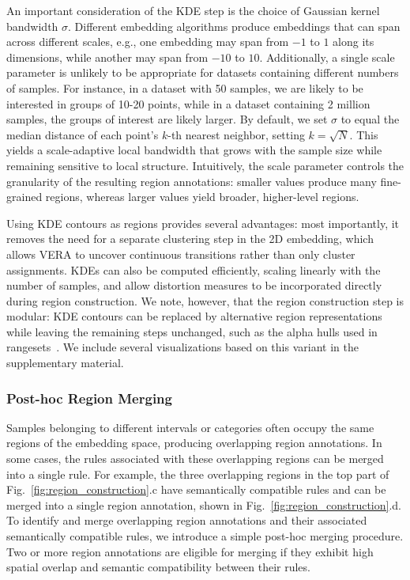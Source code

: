\documentclass[lettersize,journal]{IEEEtran}
\begin{document}
An important consideration of the KDE step is the choice of Gaussian kernel bandwidth $\sigma$.
Different embedding algorithms produce embeddings that can span across different scales, e.g., one embedding may span from $-1$ to $1$ along its dimensions, while another may span from $-10$ to $10$.
Additionally, a single scale parameter is unlikely to be appropriate for datasets containing different numbers of samples. For instance, in a dataset with 50 samples, we are likely to be interested in groups of 10-20 points, while in a dataset containing 2 million samples, the groups of interest are likely larger.
By default, we set $\sigma$ to equal the median distance of each point's $k$-th nearest neighbor, setting $k=\sqrt{N}$. This yields a scale-adaptive local bandwidth that grows with the sample size while remaining sensitive to local structure.
Intuitively, the scale parameter controls the granularity of the resulting region annotations: smaller values produce many fine-grained regions, whereas larger values yield broader, higher-level regions.

Using KDE contours as regions provides several advantages: most importantly, it removes the need for a separate clustering step in the 2D embedding, which allows VERA to uncover continuous transitions rather than only cluster assignments. KDEs can also be computed efficiently, scaling linearly with the number of samples, and allow distortion measures to be incorporated directly during region construction.
We note, however, that the region construction step is modular: KDE contours can be replaced by alternative region representations while leaving the remaining steps unchanged, such as the alpha hulls used in rangesets~\cite{Sohns2022}. We include several visualizations based on this variant in the supplementary material.

\subsubsection{Post-hoc Region Merging}
\label{sec:post-hoc-merge}

Samples belonging to different intervals or categories often occupy the same regions of the embedding space, producing overlapping region annotations.
In some cases, the rules associated with these overlapping regions can be merged into a single rule.
For example, the three overlapping regions in the top part of Fig.~\ref{fig:region_construction}.c have semantically compatible rules and can be merged into a single region annotation, shown in Fig.~\ref{fig:region_construction}.d.
To identify and merge overlapping region annotations and their associated semantically compatible rules, we introduce a simple post-hoc merging procedure.
Two or more region annotations are eligible for merging if they exhibit high spatial overlap and semantic compatibility between their rules.
\end{document}
